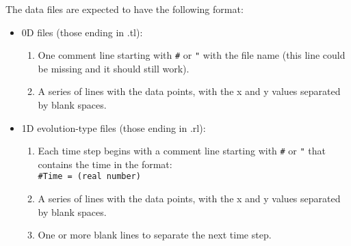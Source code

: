 \documentclass[12pt]{article}
\begin{document}
\vspace{5mm}

The data files are expected to have the following format:

\begin{itemize}

\item 0D files (those ending in .tl):

\begin{enumerate}

\item One comment line starting with \texttt{\#} or \texttt{"} with
  the file name (this line could be missing and it should still work).

\item A series of lines with the data points, with the x and y values
  separated by blank spaces.

\end{enumerate}

\item 1D evolution-type files (those ending in .rl):

\begin{enumerate}

\item Each time step begins with a comment line starting with
  \texttt{\#} or \texttt{"} that contains the time in the format: \\

\texttt{\#Time = (real number)} \\

\item A series of lines with the data points, with the x and y values
  separated by blank spaces.

\item One or more blank lines to separate the next time step.

\end{enumerate}

\end{itemize}

\vspace{3mm}


\end{document}
